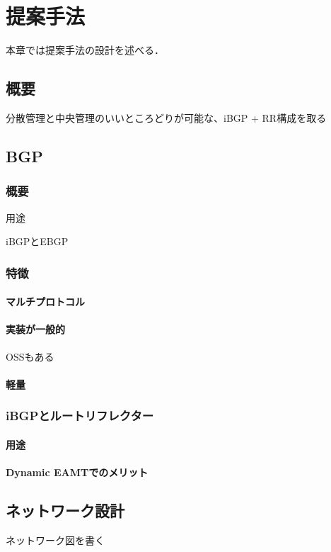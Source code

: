 \chapter{提案手法}
\label{proposal}

本章では提案手法の設計を述べる．

\section{概要}
分散管理と中央管理のいいところどりが可能な、iBGP + RR構成を取る


\section{BGP}
\subsection{概要}
用途

iBGPとEBGP

\subsection{特徴}
\subsubsection{マルチプロトコル}
\subsubsection{実装が一般的}
OSSもある
\subsubsection{軽量}

\subsection{iBGPとルートリフレクター}
\subsubsection{用途}
\subsubsection{Dynamic EAMTでのメリット}

\section{ネットワーク設計}
ネットワーク図を書く

